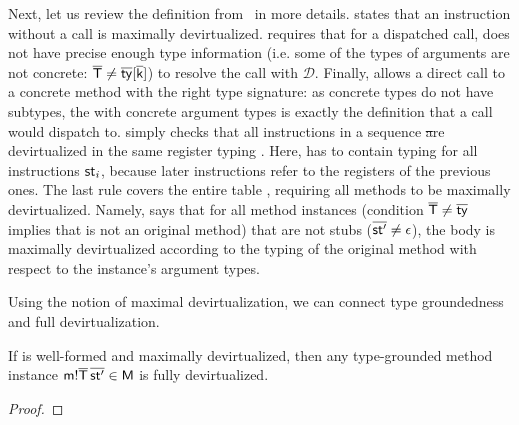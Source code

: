 Next, let us review the definition from~ in more details.
 states that an instruction without a call
is maximally devirtualized.  requires that for a dispatched call,
\ol\ty does not have precise enough type information (i.e. some of the types of
arguments are not concrete: $\ol\Ty \neq \idx{\ol\ty}{\ol\k}$) to resolve the call with
$\mathcal{D}$. Finally,  allows a direct call to a concrete method
with the right type signature: as concrete types do not have subtypes, the
\msig\m{\ol\Ty} with concrete argument types is exactly the definition that a call
\call\m{\ol{\v\k}} would dispatch to.  simply checks that all
instructions in a sequence \ol\st are devirtualized in the same register typing
\ol\ty. Here, \ol\ty has to contain typing for all instructions $\st_i$, because
later instructions refer to the registers of the previous ones. The last rule
\devirtm{\mtbl} covers the entire table \mtbl, requiring all methods to be maximally
devirtualized. Namely,  says that for all method instances
(condition $\ol\Ty \neq \ol\ty$ implies that \msig\m{\ol\Ty}
is not an original method) that are not
stubs ($\ol{\st'} \neq \done$), the body  is maximally devirtualized
according to the typing of the original method with respect to the instance's
argument types.

Using the notion of maximal devirtualization, we can connect type groundedness
and full devirtualization.

\begin{lemma}\label{lem:full-virt}
  If \mtbl is well-formed and maximally devirtualized, then any type-grounded
  method instance $\meth\m{\ol\Ty}{\ol{\v k}}\ol{\st'} \in \mtbl$ is fully
  devirtualized.
\end{lemma}
\begin{proof}
\end{proof}

